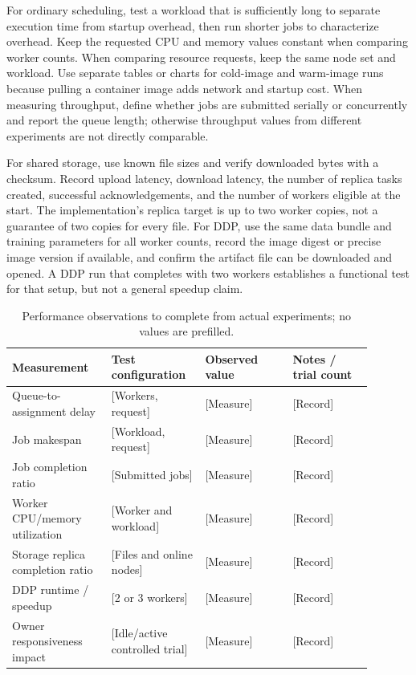 \documentclass{article}
\begin{document}
For ordinary scheduling, test a workload that is sufficiently long to separate execution time from startup overhead, then run shorter jobs to characterize overhead. Keep the requested CPU and memory values constant when comparing worker counts. When comparing resource requests, keep the same node set and workload. Use separate tables or charts for cold-image and warm-image runs because pulling a container image adds network and startup cost. When measuring throughput, define whether jobs are submitted serially or concurrently and report the queue length; otherwise throughput values from different experiments are not directly comparable.

For shared storage, use known file sizes and verify downloaded bytes with a checksum. Record upload latency, download latency, the number of replica tasks created, successful acknowledgements, and the number of workers eligible at the start. The implementation's replica target is up to two worker copies, not a guarantee of two copies for every file. For DDP, use the same data bundle and training parameters for all worker counts, record the image digest or precise image version if available, and confirm the artifact file can be downloaded and opened. A DDP run that completes with two workers establishes a functional test for that setup, but not a general speedup claim.

\begin{table}[h!]
\centering
\caption{Performance observations to complete from actual experiments; no values are prefilled.}
\label{tab:results}
\begin{tabular}{|p{0.25\linewidth}|p{0.22\linewidth}|p{0.22\linewidth}|p{0.2\linewidth}|}
\hline
Measurement & Test configuration & Observed value & Notes / trial count \\
\hline
Queue-to-assignment delay & [Workers, request] & [Measure] & [Record] \\
\hline
Job makespan & [Workload, request] & [Measure] & [Record] \\
\hline
Job completion ratio & [Submitted jobs] & [Measure] & [Record] \\
\hline
Worker CPU/memory utilization & [Worker and workload] & [Measure] & [Record] \\
\hline
Storage replica completion ratio & [Files and online nodes] & [Measure] & [Record] \\
\hline
DDP runtime / speedup & [2 or 3 workers] & [Measure] & [Record] \\
\hline
Owner responsiveness impact & [Idle/active controlled trial] & [Measure] & [Record] \\
\hline
\end{tabular}
\end{table}
\end{document}
